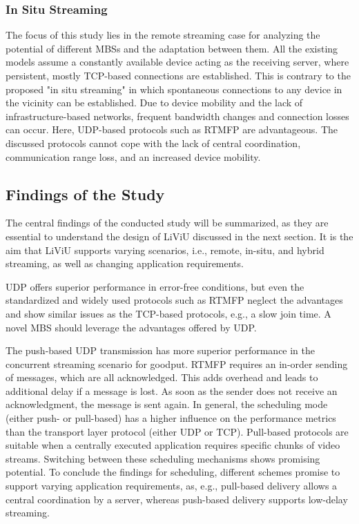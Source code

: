 \subsubsection{In Situ Streaming}
The focus of this study lies in the remote streaming case for analyzing the potential of different \ac{MBS}s and the adaptation between them.
All the existing models assume a constantly available device acting as the receiving server, where persistent, mostly \ac{TCP}-based connections are established.
This is contrary to the proposed "in situ streaming" in which spontaneous connections to any device in the vicinity can be established.
Due to device mobility and the lack of infrastructure-based networks, frequent bandwidth changes and connection losses can occur.
Here, \ac{UDP}-based protocols such as \ac{RTMFP} are advantageous.
The discussed protocols cannot cope with the lack of central coordination, communication range loss, and an increased device mobility.
\subsection{Findings of the Study}
The central findings of the conducted study will be summarized, as they are essential to understand the design of \ac{LiViU} discussed in the next section.
It is the aim that \ac{LiViU} supports varying scenarios, i.e., remote, in-situ, and hybrid streaming, as well as changing application requirements. 

\ac{UDP} offers superior performance in error-free conditions, but even the standardized and widely used protocols such as \ac{RTMFP} neglect the advantages and show similar issues as the \ac{TCP}-based protocols, e.g., a slow join time.
A novel \ac{MBS} should leverage the advantages offered by \ac{UDP}.

The push-based \ac{UDP} transmission has more superior performance in the concurrent streaming scenario for goodput.
\ac{RTMFP} requires an in-order sending of messages, which are all acknowledged.
This adds overhead and leads to additional delay if a message is lost. 
As soon as the sender does not receive an acknowledgment, the message is sent again. 
In general, the scheduling mode (either push- or pull-based) has a higher influence on the performance metrics than the transport layer protocol (either \ac{UDP} or \ac{TCP}).
Pull-based protocols are suitable when a centrally executed application requires specific chunks of video streams.
Switching between these scheduling mechanisms shows promising potential. 
To conclude the findings for scheduling, different schemes promise to support varying application requirements, as, e.g., pull-based delivery allows a central coordination by a server, whereas push-based delivery supports low-delay streaming.

